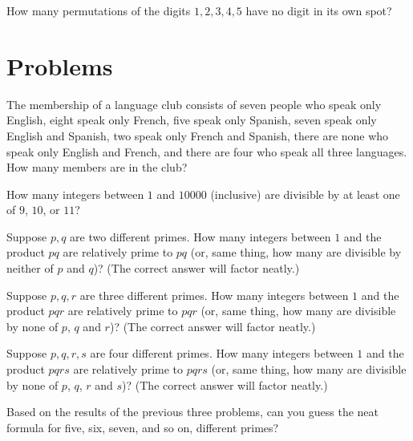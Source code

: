 \begin{exer}
How many permutations of the digits $1,2,3,4,5$ have no digit in its own spot?
\end{exer}

\section{Problems}

\begin{prob}
The membership of a language club consists of seven people who speak only English, eight speak only French, five speak only Spanish, seven speak only English and Spanish, two speak only French and Spanish, there are none who speak only English and French, and there are four who speak all three languages. How many members are in the club?
\end{prob}

\begin{prob}
How many integers between $1$ and $10000$ (inclusive) are divisible by at least one of $9$, $10$, or $11$? 
\end{prob}

\begin{prob}
Suppose $p,q$ are two different primes. How many integers between $1$ and the product $pq$ are relatively prime to $pq$ (or, same thing,
how many are divisible by neither of $p$ and  $q$)? (The correct answer will factor neatly.) 
\end{prob}

\begin{prob}
Suppose $p,q,r$ are three different primes. How many integers between $1$ and the product $pqr$ are relatively prime to $pqr$ (or, same thing,
how many are divisible by none of $p$, $q$ and $r$)? (The correct answer will factor neatly.) 
\end{prob}

\begin{prob}
Suppose $p,q,r,s$ are four different primes. How many integers between $1$ and the product $pqrs$ are relatively prime to $pqrs$ (or, same thing,
how many are divisible by none of $p$, $q$, $r$ and $s$)? (The correct answer will factor neatly.) 
\end{prob}

\begin{prob}
Based on the results of the previous three problems, can you guess the neat formula for five, six, seven, and so on, different primes?
\end{prob}

